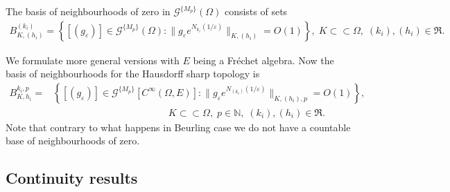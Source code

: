 \documentclass[sn-mathphys,Numbered]{sn-jnl}%
\theoremstyle{thmstyleone}%
\newtheorem{proposition}[theorem]{Proposition}%
\theoremstyle{thmstyletwo}%
\theoremstyle{thmstylethree}%
\begin{document}
The basis of  neighbourhoods of zero in $\mathcal G^{\{M_p\}}(\Omega)$ consists of  sets
\begin{align*}
B^{(k_i)}_{K,(h_i)}=\left\{[(g_{\varepsilon})]\in\mathcal G^{\{M_p\}}(\Omega):\|g_{\varepsilon}e^{{N}_{k_i}({1}/{\varepsilon})}\|_ {K,(h_i)}=O(1)\right\},
\; K\subset\subset \Omega, \; (k_i), (h_i)\in\mathfrak{R}.
\end{align*}

We formulate more general versions with $E$ being  a Fr\'echet algebra.  Now the basis of neighbourhoods for  the Hausdorff sharp  topology is
\begin{align*}
B^{k_i,p}_{K,h_i}=&\left\{ [(g_{\varepsilon})] \in\mathcal G^{\{M_p\}}[C^\infty(\Omega,E)]: \|g_\varepsilon e^{{N}_{(k_i)}(1/\varepsilon)}\|_{K,(h_i),p}=O(1)\right\}, \\
 &\hspace{5cm} K\subset\subset \Omega, \; p\in\mathbb N, \; (k_i), (h_i)\in\mathfrak{R}.
\end{align*}
Note that contrary to what happens in Beurling case we do not have a countable base of neighbourhoods of zero.  %



\subsection{Continuity results}    
\end{document}
